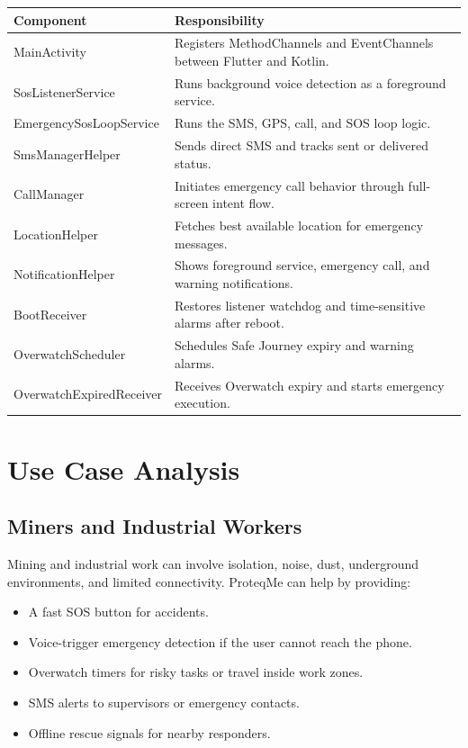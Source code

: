 \documentclass[12pt,a4paper]{report}
\newcommand{\projectname}{ProteqMe}
\begin{document}
\begin{longtable}{p{}p{}}
\toprule
\textbf{Component} & \textbf{Responsibility} \\
\midrule
MainActivity & Registers MethodChannels and EventChannels between Flutter and Kotlin. \\
SosListenerService & Runs background voice detection as a foreground service. \\
EmergencySosLoopService & Runs the SMS, GPS, call, and SOS loop logic. \\
SmsManagerHelper & Sends direct SMS and tracks sent or delivered status. \\
CallManager & Initiates emergency call behavior through full-screen intent flow. \\
LocationHelper & Fetches best available location for emergency messages. \\
NotificationHelper & Shows foreground service, emergency call, and warning notifications. \\
BootReceiver & Restores listener watchdog and time-sensitive alarms after reboot. \\
OverwatchScheduler & Schedules Safe Journey expiry and warning alarms. \\
OverwatchExpiredReceiver & Receives Overwatch expiry and starts emergency execution. \\
\bottomrule
\end{longtable}

\chapter{Use Case Analysis}

\section{Miners and Industrial Workers}

Mining and industrial work can involve isolation, noise, dust, underground environments, and limited connectivity. \projectname{} can help by providing:

\begin{itemize}
    \item A fast SOS button for accidents.
    \item Voice-trigger emergency detection if the user cannot reach the phone.
    \item Overwatch timers for risky tasks or travel inside work zones.
    \item SMS alerts to supervisors or emergency contacts.
    \item Offline rescue signals for nearby responders.
\end{itemize}
\end{document}

